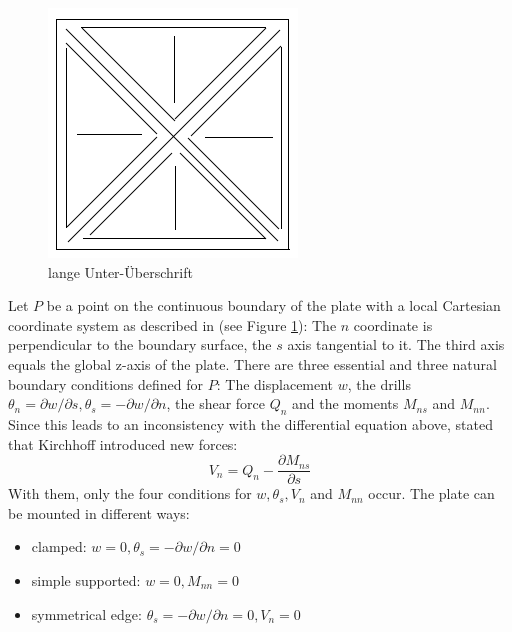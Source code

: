   \begin{figure} %
  	\centering
  	\includegraphics[width=0.7\linewidth]{figures/platzhalter}
  	\caption[kurze Unter-Überschrift]{lange Unter-Überschrift}
  	\label{fig:platzhalter}
  \end{figure}
  Let $P$ be a point on the continuous boundary of the plate with a local Cartesian coordinate system as described in \cite{steinke2005finite} (see Figure \ref{fig:platzhalter}): The $n$ coordinate is perpendicular to the boundary surface, the $s$ axis tangential to it. The third axis equals the global z-axis of the plate. There are three essential and three natural boundary conditions defined for $P$: The displacement $w$, the drills $\theta_n = \partial w/\partial s, \theta_s = -\partial w/\partial n$, the shear force $Q_n$ and the moments $M_{ns}$ and $M_{nn}$. Since this leads to an inconsistency with the differential equation above, \cite{steinke2005finite} stated that Kirchhoff introduced new forces:
  \begin{equation}
  V_n = Q_n - \frac{\partial M_{ns}}{\partial s}
  \end{equation}
  With them, only the four conditions for $w, \theta_s, V_n$ and $M_{nn}$ occur.
  The plate can be mounted in different ways:
  \begin{itemize}
  	\item clamped: $w = 0, \theta_s = -\partial w/\partial n = 0$
  	\item simple supported: $w = 0, M_{nn} = 0$
  	\item symmetrical edge: $\theta_s = -\partial w/\partial n = 0, V_n = 0$
  \end{itemize}

